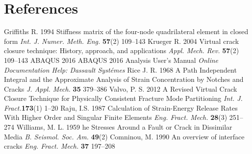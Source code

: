 \documentclass[a4paper]{jpconf}
\begin{document}
\clearpage

%



\section*{References}
\begin{thebibliography}{9}
Griffiths  R. 1994 Stiffness matrix of the four-node quadrilateral element in closed form {\it Int. J. Numer. Meth. Eng.} {\bf 57}(2) 109--143
Krueger R. 2004 Virtual crack closure technique: History, approach, and applications {\it Appl. Mech. Rev.} {\bf 57}(2) 109--143
 ABAQUS 2016 ABAQUS 2016 Analysis User's Manual {\it Online Documentation Help: Dassault Syst\'emes}
Rice J. R. 1968 A Path Independent Integral and the Approximate Analysis of Strain Concentration by Notches and Cracks {\it J. Appl. Mech.} {\bf 35} 379--386
Valvo, P. S. 2012 A Revised Virtual Crack Closure Technique for Physically Consistent Fracture Mode Partitioning {\it Int. J. Fract.}{\bf 173}(1) 1--20
Raju, I.S. 1987 Calculation of Strain-Energy Release Rates With Higher Order and Singular Finite Elements {\it Eng. Fract. Mech.} {\bf 28}(3) 251--274
Williams, M. L. 1959 he Stresses Around a Fault or Crack in Dissimilar Media {\it B. Seismol. Soc. Am.} {\bf 49}(2)
Comninou, M. 1990 An overview of interface cracks {\it Eng. Fract. Mech.} {\bf 37} 197--208
\end{thebibliography}

\end{document}
